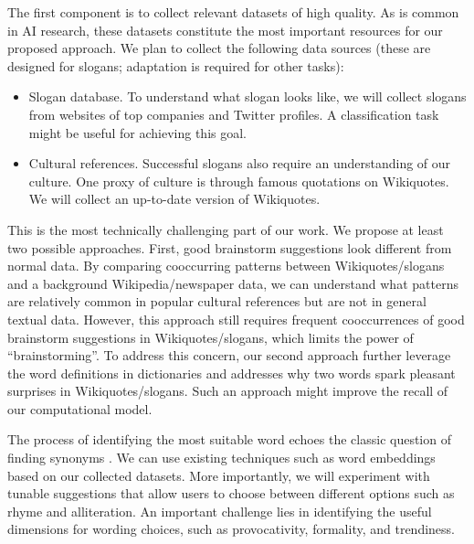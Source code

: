 The first component is to collect relevant datasets of high quality.
As is common in 
AI research,
these datasets constitute the most important resources for our proposed approach.
We plan to collect the following data sources (these are designed for slogans; adaptation is required for other tasks):
\begin{itemize}[leftmargin=*,noitemsep,topsep=0pt,parsep=0pt,partopsep=0pt]
  \item Slogan database. To understand what slogan looks like, we will collect slogans from websites of top companies and Twitter profiles.
  A classification task might be useful for achieving this goal.
  \item Cultural references. Successful slogans also require an understanding of our culture. One proxy of culture is through famous quotations on Wikiquotes. We will collect an up-to-date version of Wikiquotes.
\end{itemize}




This is the most technically challenging part of our work.
We propose at least two possible approaches.
First, good brainstorm suggestions look different from normal data.
By comparing cooccurring patterns between Wikiquotes/slogans and a background Wikipedia/newspaper data, we can understand what patterns are relatively common in popular cultural references but are not in general textual data.
However, this approach still requires frequent cooccurrences of good brainstorm suggestions in Wikiquotes/slogans, which limits the power of ``brainstorming''.
To address this concern, our second approach further 
leverage the word definitions in dictionaries and 
addresses why two words spark pleasant surprises in Wikiquotes/slogans.
Such an approach 
might improve the recall of our computational model.

 The process of identifying the most suitable word echoes the classic question of finding synonyms \citep{turney2008uniform}.
We can use existing techniques such as word embeddings based on our collected datasets.
More importantly, we will experiment with tunable suggestions that allow users to choose between different options such as rhyme and alliteration.
An important challenge lies in identifying the useful dimensions for wording choices, such as provocativity, formality, and trendiness.

